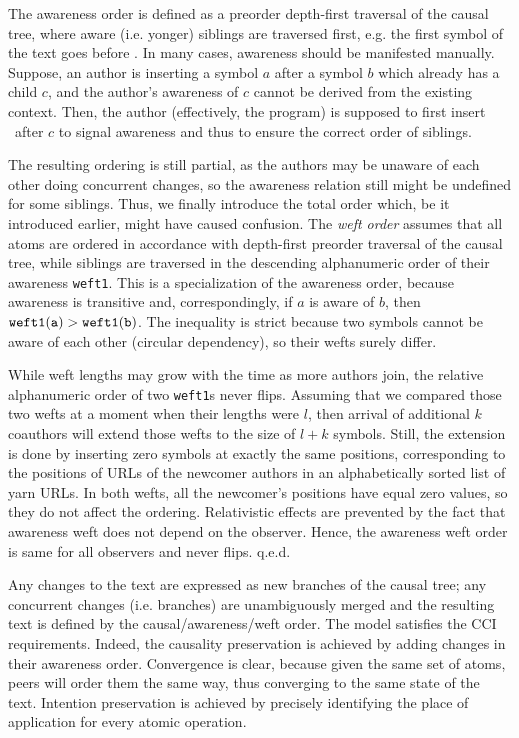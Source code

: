 \documentclass{acm_proc_article-sp}
\begin{document}
The awareness order is  defined as a preorder depth-first traversal of the causal tree, where aware (i.e. yonger) siblings are traversed first, e.g. the first symbol of the text goes before \eoa.
In many cases, awareness should be manifested manually.
Suppose, an author is inserting a symbol $a$ after a symbol $b$ which already has a child $c$, and the author's awareness of $c$ cannot be derived from the existing context.
Then, the author (effectively, the program) is supposed to first insert \zero ~after $c$ to signal awareness and thus to ensure the correct order of siblings.

The resulting ordering is still partial, as the authors may be unaware of each other doing concurrent changes, so the awareness relation still might be undefined for some siblings.
Thus, we finally introduce the total order which, be it introduced earlier, might have caused confusion.
The \emph{weft order} assumes that all atoms are ordered in accordance with depth-first preorder traversal of the causal tree, while siblings are traversed in the descending  alphanumeric order of their awareness {\tt weft1}.
This is a specialization of the awareness order, because awareness is transitive and, correspondingly, if $a$ is aware of $b$, then $\tt weft1(a) > weft1(b)$.
The inequality is strict because two symbols cannot be aware of each other (circular dependency), so their wefts surely differ.

While weft lengths may grow with the time as more authors join, the relative alphanumeric order of two {\tt weft1}s never flips.
Assuming that we compared those two wefts at a moment when their lengths were $l$, then arrival of additional $k$ coauthors will extend those wefts to the size of $l+k$ symbols.
Still, the extension is done by inserting zero symbols at exactly the same positions, corresponding to the positions of URLs of the newcomer authors in an alphabetically sorted list of yarn URLs.
In both wefts, all the newcomer's positions have equal zero values, so they do not affect the ordering.
Relativistic effects are prevented by the fact that awareness weft does not depend on the observer.
Hence, the awareness weft order is same for all observers and never flips. q.e.d.

Any changes to the text are expressed as new branches  of the causal tree; any concurrent changes (i.e. branches) are unambiguously merged and the resulting text is defined by the causal/awareness/weft order.
The model satisfies the CCI requirements.
Indeed, the causality preservation is achieved by adding changes in their awareness order.
Convergence is clear, because given the same set of atoms, peers will order them the same way, thus converging to the same state of the text.
Intention preservation is achieved by precisely identifying the place of application for every atomic operation.
\end{document}

